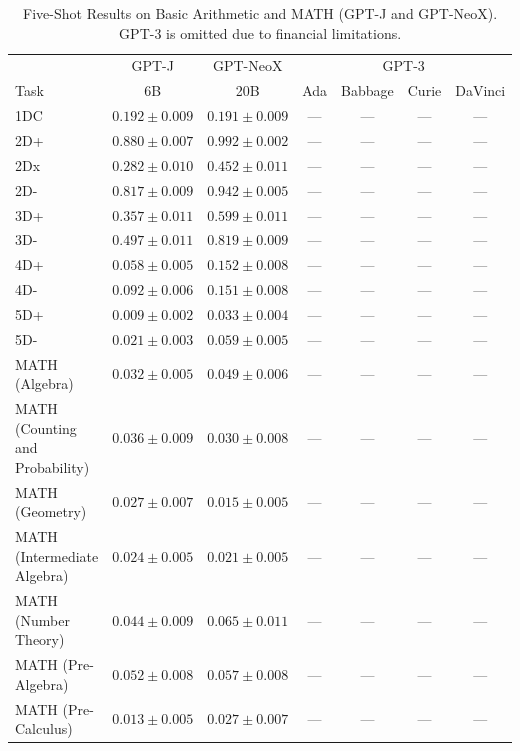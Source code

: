\documentclass[11pt]{article}
\begin{document}
{\begin{landscape}
\begin{table}
\centering %
\begin{tabular}{l c c c c c c } \\ 
& GPT-J & GPT-NeoX & \multicolumn{4}{c}{GPT-3} \\
Task & 6B & 20B & Ada & Babbage & Curie & DaVinci \\ \toprule
1DC & $0.192 \pm 0.009$ & $0.191 \pm 0.009$ & --- & --- & --- & ---  \\ 
2D+ & $0.880 \pm 0.007$ & $0.992 \pm 0.002$ & --- & --- & --- & --- \\ 
2Dx & $0.282 \pm 0.010$ & $0.452 \pm 0.011$ & --- & --- & --- & --- \\ 
2D- & $0.817 \pm 0.009$ & $0.942 \pm 0.005$ & --- & --- & --- & --- \\ 
3D+ & $0.357 \pm 0.011$ & $0.599 \pm 0.011$ & --- & --- & --- & --- \\ 
3D- & $0.497 \pm 0.011$ & $0.819 \pm 0.009$ & --- & --- & --- & --- \\ 
4D+ & $0.058 \pm 0.005$ & $0.152 \pm 0.008$ & --- & --- & --- & --- \\ 
4D- & $0.092 \pm 0.006$ & $0.151 \pm 0.008$ & --- & --- & --- & --- \\ 
5D+ & $0.009 \pm 0.002$ & $0.033 \pm 0.004$ & --- & --- & --- & --- \\ 
5D- & $0.021 \pm 0.003$ & $0.059 \pm 0.005$ & --- & --- & --- & --- \\ 
MATH (Algebra) & $0.032 \pm 0.005$ & $0.049 \pm 0.006$ & --- & --- & --- & --- \\ 
MATH (Counting and Probability) & $0.036 \pm 0.009$ & $0.030 \pm 0.008$& --- & --- & --- & ---  \\ 
MATH (Geometry) & $0.027 \pm 0.007$ & $0.015 \pm 0.005$ & --- & --- & --- & --- \\ 
MATH (Intermediate Algebra) & $0.024 \pm 0.005$ & $0.021 \pm 0.005$ & --- & --- & --- & --- \\ 
MATH (Number Theory) & $0.044 \pm 0.009$ & $0.065 \pm 0.011$ & --- & --- & --- & --- \\ 
MATH (Pre-Algebra) & $0.052 \pm 0.008$ & $0.057 \pm 0.008$ & --- & --- & --- & --- \\ 
MATH (Pre-Calculus) & $0.013 \pm 0.005$ & $0.027 \pm 0.007$ & --- & --- & --- & --- \\ 
\bottomrule 
\end{tabular}
\caption{Five-Shot Results on Basic Arithmetic and MATH (GPT-J and GPT-NeoX). GPT-3 is omitted due to financial limitations.}
\label{tab:math_gpt_5}
\end{table}


\end{landscape}}
\end{document}
